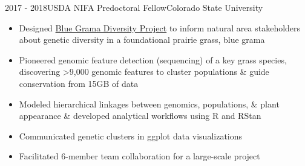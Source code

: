 \documentclass[letterpaper]{twentysecondcv} %
\begin{document}
\begin{twenty}
 \twentyitem
    	{2017 - }{2018}{USDA NIFA Predoctoral Fellow}{Colorado State University}
        	{}
	{ \vspace{-1mm}
        {\begin{itemize}
        \item Designed \textcolor{special}{\href{https://github.com/avahoffman/blue-grama-diversity}{Blue Grama Diversity Project}} to inform natural area stakeholders about genetic diversity in a foundational prairie grass, blue grama
        		\vspace{1mm} 
        \item Pioneered genomic feature detection (sequencing) of a key grass species, discovering >9,000 genomic features to cluster populations \& guide conservation from 15GB of data
        		\vspace{1mm} 
        \item Modeled hierarchical linkages between genomics, populations, \& plant appearance \& developed analytical workflows using R and RStan
        		\vspace{1mm} 
        \item Communicated genetic clusters in ggplot data visualizations 
                \vspace{1mm} 
        \item Facilitated 6-member team collaboration for a large-scale project 
	\end{itemize}}  \vspace{6mm}  } 


\end{twenty}
\end{document}
